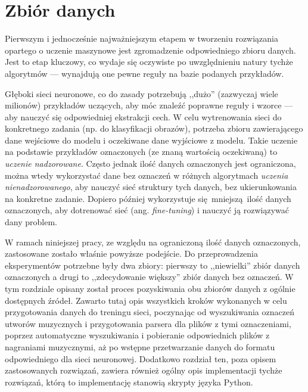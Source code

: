 \chapter{Zbiór danych} \label{chapter:dataset}


Pierwszym i jednocześnie najważniejszym etapem w tworzeniu rozwiązania opartego o uczenie maszynowe jest zgromadzenie odpowiedniego zbioru danych. Jest to etap kluczowy, co wydaje się oczywiste po uwzględnieniu natury tychże algorytmów --- wynajdują one pewne reguły na bazie podanych przykładów.

Głęboki sieci neuronowe, co do zasady potrzebują ,,dużo'' (zazwyczaj wiele milionów) przykładów uczących, aby móc znaleźć poprawne reguły i wzorce --- aby nauczyć się odpowiedniej ekstrakcji cech. W celu wytrenowania sieci do konkretnego zadania (np. do klasyfikacji obrazów), potrzeba zbioru zawierającego dane wejściowe do modelu i oczekiwane dane wyjściowe z modelu. Takie uczenie na podstawie przykładów oznaczonych (ze znaną wartością oczekiwaną) to \emph{uczenie nadzorowane}. Często jednak ilość danych oznaczonych jest ograniczona, można wtedy wykorzystać dane bez oznaczeń w różnych algorytmach \emph{uczenia nienadzorowanego}, aby nauczyć sieć struktury tych danych, bez ukierunkowania na konkretne zadanie. Dopiero później wykorzystuje się mniejszą ilość danych oznaczonych, aby dotrenować sieć (ang. \emph{fine-tuning}) i nauczyć ją rozwiązywać dany problem.

W ramach niniejszej pracy, ze względu na ograniczoną ilość danych oznaczonych, zastosowane zostało właśnie powyższe podejście. Do przeprowadzenia eksperymentów potrzebne były dwa zbiory: pierwszy to ,,niewielki'' zbiór danych oznaczonych a drugi to ,,zdecydowanie większy'' zbiór danych bez oznaczeń. W tym rozdziale opisany został proces pozyskiwania obu zbiorów danych z ogólnie dostępnych źródeł. Zawarto tutaj opis wszystkich kroków wykonanych w celu przygotowania danych do treningu sieci, poczynając od wyszukiwania oznaczeń utworów muzycznych i przygotowania parsera dla plików z tymi oznaczeniami, poprzez automatyczne wyszukiwania i pobieranie odpowiednich plików z nagraniami muzycznymi, aż po wstępne przetwarzanie danych do formatu odpowiedniego dla sieci neuronowej. Dodatkowo rozdział ten, poza opisem zastosowanych rozwiązań, zawiera również ogólny opis implementacji tychże rozwiązań, którą to implementację stanowią skrypty języka Python.

